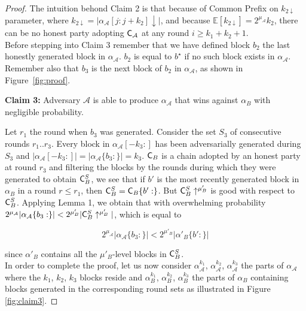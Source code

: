\begin{proof}
	The intuition behond Claim 2 is that because of Common Prefix on $k_{2\downarrow}$ parameter, where
	$k_{2\downarrow} = \vert \alpha_\mathcal{A}[j:j+k_2]\downarrow\vert$, and because
	$\mathbb{E}[k_{2\downarrow}] = 2^{\mu_\mathcal{A}}k_2$, there can be no honest party adopting
	$\mathsf{C}_\mathcal{A}$ at any round $i \geq k_1 + k_2 + 1$. \\

Before stepping into Claim 3 remember that we have defined block $b_2$ the last honestly generated block in $\alpha_\mathcal{A}$. $b_2$ is equal to $b^\star$ if no such block exists in $\alpha_\mathcal{A}$. Remember also that $b_3$ is the next block of $b_2$ in $\alpha_\mathcal{A}$, as shown in Figure~\ref{fig:proof}.

	\noindent
	\textbf{Claim 3:} Adversary $\mathcal{A}$ is able to produce $\alpha_\mathcal{A}$ that wins against $\alpha_B$ with negligible probability.

	\noindent
	Let $r_1$ the round when $b_3$ was generated.
	Consider the set $S_3$ of consecutive rounds $r_1..r_3$. Every block in
	$\alpha_\mathcal{A}[-k_3:]$ has been adversarially generated during $S_3$ and $\vert
	\alpha_\mathcal{A}[-k_3:] \vert = \vert \alpha_\mathcal{A}\{b_3:\} \vert = k_3$. $\mathsf{C}_B$ is a chain
	adopted by an honest party at round $r_3$ and filtering the blocks by the rounds
	during which they were generated to obtain $\mathsf{C}_B^S$, we see that if $b'$ is the
	most recently generated block in $\alpha_B$ in a round $r \leq r_1$, then $\mathsf{C}_B^S =
	\mathsf{C}_B\{ b': \}$. But $\mathsf{C}_B^S \uparrow^{\mu'_B}$ is good with respect to $\mathsf{C}_B^S$.
	Applying Lemma 1, we obtain that with overwhelming probability  $2^{\mu_\mathcal{A}} \vert
	\alpha_\mathcal{A}\{b_3:\} \vert < 2^{\mu'_B} \vert \mathsf{C}_B^S \uparrow^{\mu'_B} \vert$, which is
	equal to

	\begin{equation}
	2^{\mu_\mathcal{A}} \vert \alpha_\mathcal{A}\{b_3:\} \vert < 2^{\mu'_B} \vert \alpha'_B\{b':\} \vert
	\end{equation} 

	since $\alpha'_B$ contains all the $\mu'_B$-level blocks in $\mathsf{C}_B^S$. \\

	In order to complete the proof, let us now consider $\alpha_\mathcal{A}^{k_1}$,
	$\alpha_\mathcal{A}^{k_2}$, $\alpha_\mathcal{A}^{k_3}$ the parts of $\alpha_\mathcal{A}$ where the
	$k_1$, $k_2$, $k_3$ blocks reside and $\alpha_B^{k_1}$, $\alpha_B^{k_2}$,
	$\alpha_B^{k_3}$ the parts of $\alpha_B$ containing blocks generated in the
	corresponding round sets as illustrated in Figure \ref{fig:claim3}.


\end{proof}

